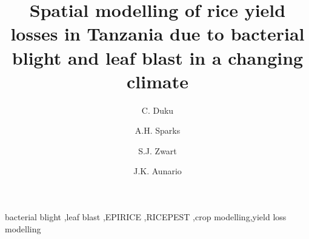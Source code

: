 \documentclass[preprint,12pt]{elsarticle}
\begin{document}
\begin{frontmatter}



\title{Spatial modelling of rice yield losses in Tanzania due to bacterial blight and leaf blast in a changing climate} 


\author[AfricaRice]{C. Duku}
\author[IRRI]{A.H. Sparks}
\author[AfricaRice]{S.J. Zwart}
\author[IRRI]{J.K. Aunario}


\address[AfricaRice]{Africa Rice Center (AfricaRice), 01 BP 2031, Cotonou, BENIN}
\address[IRRI]{International Rice Research Institute (IRRI), DAPO Box 7777, Metro Manila, 1301, PHILIPPINES}

\begin{abstract}

\end{abstract}

\begin{keyword}
bacterial blight \sep leaf blast \sep EPIRICE \sep RICEPEST \sep crop modelling\sep yield loss modelling
\end{keyword}

\end{frontmatter}
\end{document}

